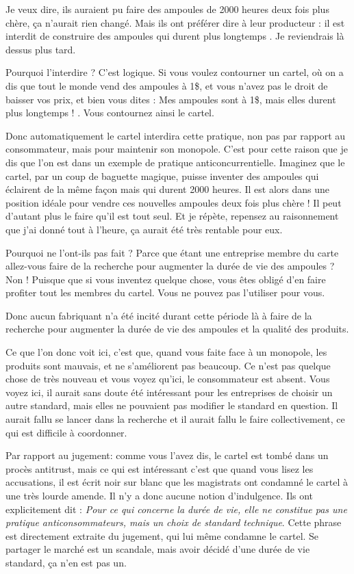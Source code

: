 \begin{small}
Je veux dire, ils auraient pu faire des ampoules de 2000 heures deux fois plus chère, ça n'aurait rien changé. Mais ils ont préférer dire à leur producteur :  \og il est interdit de construire des ampoules qui durent plus longtemps \fg{}. Je reviendrais là dessus plus tard.


Pourquoi l'interdire ? C'est logique. Si vous voulez contourner un cartel, où on a dis que tout le monde vend des ampoules à 1\$, et vous n'avez pas le droit de baisser vos prix, et bien vous dites :  \og Mes ampoules sont à 1\$, mais elles durent plus longtemps ! \fg{}. Vous contournez ainsi le cartel.

\smallbreak

Donc automatiquement le cartel interdira cette pratique, non pas par rapport au consommateur, mais pour maintenir son monopole. C'est pour cette raison que je dis que l'on est dans un exemple de pratique anticoncurrentielle. Imaginez que le cartel, par un coup de baguette magique, puisse inventer des ampoules qui éclairent de la même façon mais qui durent 2000 heures. Il est alors dans une position idéale pour vendre ces nouvelles ampoules deux fois plus chère ! Il peut d'autant plus le faire qu'il est tout seul. Et je répète, repensez au raisonnement que j'ai donné tout à l'heure, ça aurait été très rentable pour eux. 

Pourquoi  ne l'ont-ils pas fait ? Parce que étant une entreprise membre du carte allez-vous faire de la recherche pour augmenter la durée de vie des ampoules ? Non ! Puisque que si vous inventez quelque chose, vous êtes obligé d'en faire profiter tout les membres du cartel. Vous ne pouvez pas l'utiliser pour vous.


Donc aucun fabriquant n'a été incité durant cette période là à faire de la recherche pour augmenter la durée de vie des ampoules et la qualité des produits.
\smallbreak 

Ce que l'on donc voit ici, c'est que, quand vous faite face à un monopole,  les produits sont mauvais, et ne s'améliorent pas beaucoup. Ce n'est pas quelque chose de très nouveau et vous voyez qu'ici, le consommateur est absent. Vous voyez ici, il aurait sans doute été intéressant pour les entreprises de choisir un autre standard, mais elles ne pouvaient pas modifier le standard en question. Il aurait fallu se lancer dans la recherche et il aurait fallu le faire collectivement, ce qui est difficile à coordonner.

\medbreak

Par rapport au jugement: comme vous l'avez dis, le cartel est tombé dans un procès antitrust, mais ce qui est intéressant c'est que quand vous lisez les accusations, il est écrit noir sur blanc que les magistrats ont condamné le cartel à une très lourde amende. Il n'y a donc aucune notion d'indulgence. Ils ont explicitement dit :  \textit{Pour ce qui concerne la durée de vie, elle ne constitue pas une pratique anticonsommateurs, mais un choix de standard technique}. Cette phrase est directement extraite du jugement, qui lui même condamne le cartel. Se partager le marché est un scandale, mais avoir décidé d'une durée de vie standard, ça n'en est pas un.


\end{small}
